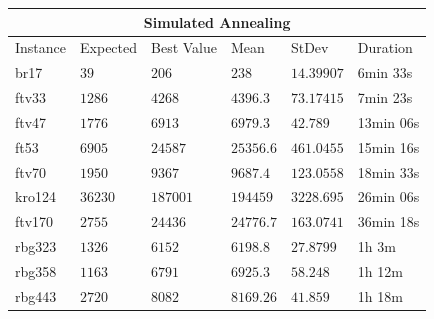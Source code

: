 \documentclass[12pt,leqno]{article}
\begin{document}
\begin{center}
  \begin{tabular}{|p{2.3cm}|p{2cm}||p{3cm}|p{2cm}|p{2cm}|p{2cm}|} 
    \hline
    \multicolumn{6}{|c|}{Simulated Annealing} \\
    \hline
    Instance      &  Expected  & Best Value & Mean & StDev & Duration \\ 
    \hline\hline
    br17          & $39$ & $ 206 $ & $ 238 $ & $ 14.39907 $ & 6min 33s \\ 
    \hline
    ftv33         & $1286$ & $ 4268 $ & $ 4396.3 $ & $ 73.17415 $ & 7min 23s \\ 
    \hline
    ftv47         & $ 1776 $ & $ 6913 $ & $ 6979.3 $ & $42.789$ & 13min 06s \\ 
    \hline
    ft53          & $6905$ & $ 24587 $ & $ 25356.6 $ & $ 461.0455 $ & 15min 16s \\ 
    \hline
    ftv70         & $1950$ & $ 9367 $ & $ 9687.4 $ & $123.0558 $ & 18min 33s \\ 
    \hline
    kro124        & $36230$ & $ 187001 $ & $ 194459 $ & $ 3228.695 $ & 26min 06s \\ 
    \hline
    ftv170        & $2755$ & $ 24436 $ & $ 24776.7 $ & $ 163.0741 $ & 36min 18s \\ 
    \hline
    rbg323        & $1326$ & $ 6152 $ & $ 6198.8 $ & $ 27.8799 $ & 1h 3m \\ 
    \hline
    rbg358        & $1163$ & $ 6791 $ & $ 6925.3 $ & $ 58.248 $ & 1h 12m \\ 
    \hline
    rbg443        & $2720$ & $ 8082 $ & $ 8169.26 $ & $ 41.859 $ & 1h 18m \\ 
    \hline
 \end{tabular}
\end{center}
\end{document}
